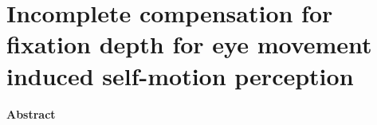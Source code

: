 
\thispagestyle{empty}


\chapter{Incomplete compensation for fixation depth for eye movement induced self-motion perception}
\chaptermark{}

\newpage

\small {\bf Abstract} 

\vfill

\noindent\underline{ \hspace{4cm} }


\newpage






